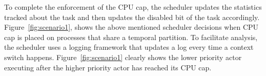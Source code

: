 To complete the enforcement of the CPU cap, the scheduler updates the
statistics tracked about the task and then updates the disabled bit of
the task accordingly.
Figure~\ref{fig:scenario1}, shows
the above mentioned scheduler decisions when CPU cap is placed on
processes that share a temporal partition.  
To facilitate analysis, the scheduler uses a logging framework that
updates a log every time a context switch happens.  Figure~\ref{fig:scenario1} clearly shows the lower priority actor
executing after the higher priority actor has reached its CPU cap. 





